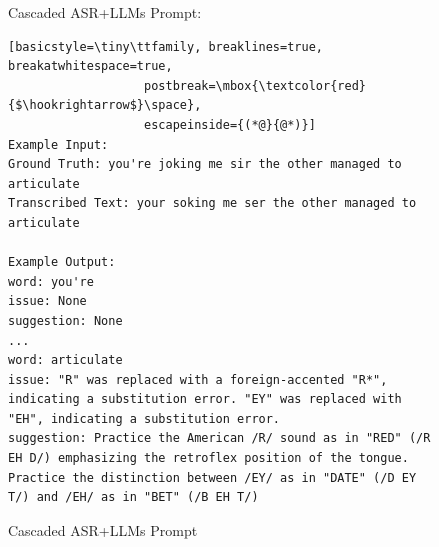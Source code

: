 \documentclass[11pt]{article}
\begin{document}
\begin{figure}[ht]
\begin{AIBox}{Cascaded ASR+LLMs Prompt:}
\begin{minipage}[t]{\textwidth}
\begin{lstlisting}[basicstyle=\tiny\ttfamily, breaklines=true, breakatwhitespace=true,
                   postbreak=\mbox{\textcolor{red}{$\hookrightarrow$}\space},
                   escapeinside={(*@}{@*)}]
Example Input:
Ground Truth: you're joking me sir the other managed to articulate
Transcribed Text: your soking me ser the other managed to articulate

Example Output:
word: you're
issue: None
suggestion: None
...
word: articulate
issue: "R" was replaced with a foreign-accented "R*", indicating a substitution error. "EY" was replaced with "EH", indicating a substitution error.
suggestion: Practice the American /R/ sound as in "RED" (/R EH D/) emphasizing the retroflex position of the tongue. Practice the distinction between /EY/ as in "DATE" (/D EY T/) and /EH/ as in "BET" (/B EH T/)

\end{lstlisting}
\end{minipage}

\end{AIBox}
\caption{Cascaded ASR+LLMs Prompt}
\label{fig:cascade_asr_llm_prompt}
\end{figure}
\end{document}
